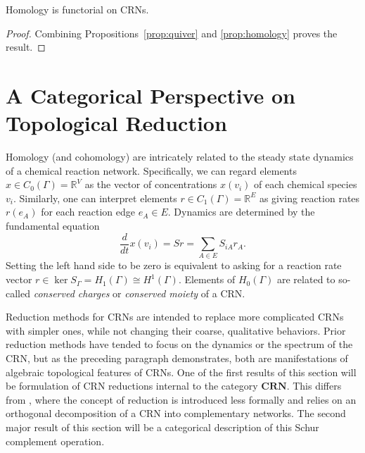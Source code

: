 \documentclass[11pt, one side, article]{memoir}
\newcommand{\R}{\mathbb{R}}
\begin{document}
\begin{corollary}
    Homology is functorial on CRNs.
\end{corollary}
\begin{proof}
    Combining Propositions~\ref{prop:quiver} and \ref{prop:homology} proves the result.
\end{proof}


\chapter{A Categorical Perspective on Topological Reduction}

Homology (and cohomology) are intricately related to the steady state dynamics of a chemical reaction network.
Specifically, we can regard elements $x\in C_0(\Gamma)=\R^V$ as the vector of concentrations $x(v_i)$ of each chemical species $v_i$.
Similarly, one can interpret elements $r\in C_1(\Gamma)=\R^E$ as giving reaction rates $r(e_A)$ for each reaction edge $e_A\in E$.
Dynamics are determined by the fundamental equation
\begin{equation}
    \frac{d}{dt} x(v_i) = Sr = \sum_{A\in E} S_{iA}r_A.
\end{equation}
Setting the left hand side to be zero is equivalent to asking for a reaction rate vector $r\in \ker S_{\Gamma}=H_1(\Gamma)\cong H^1(\Gamma)$.
Elements of $H_0(\Gamma)$ are related to so-called \emph{conserved charges} or \emph{conserved moiety} of a CRN.

Reduction methods for CRNs are intended to replace more complicated CRNs with simpler ones, while not changing their coarse, qualitative behaviors.
Prior reduction methods have tended to focus on the dynamics \cite{FEINBERG198059, FEINBERG1974775, FEINBERG19891819} or the spectrum \cite{jost2018hypergraph, veerman2022chemicalreactionnetworkslaplacian} of the CRN, but as the preceding paragraph demonstrates, both are manifestations of algebraic topological features of CRNs.
One of the first results of this section will be formulation of CRN reductions internal to the category $\mathbf{CRN}$.
This differs from \cite{Hirono2021}, where the concept of reduction is introduced less formally and relies on an orthogonal decomposition of a CRN into complementary networks.
The second major result of this section will be a categorical description of this Schur complement operation.
\end{document}
